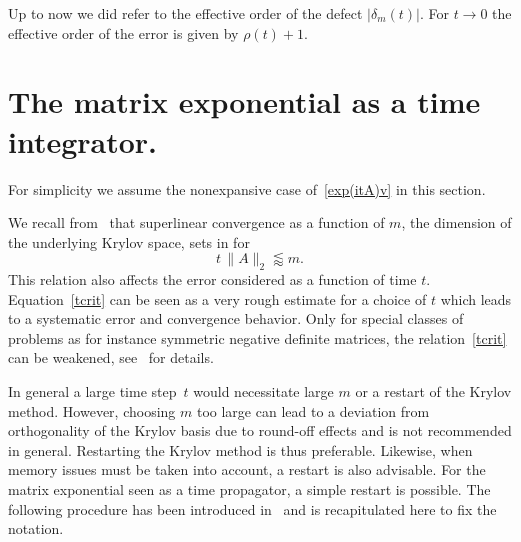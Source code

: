 \documentclass[smallextended]{svjour3pre}%
\numberwithin{equation}{section}
\numberwithin{figure}{section}
\numberwithin{table}{section}
\newcommand\tjnew[1]{{#1}}
\newcommand\Opgen{A}
\begin{document}
Up to now we did refer to the effective order of the defect $|\delta_m(t)|$. For $t \to 0$ the effective order of the error is given by $\rho(t)+1$.


\section{The matrix exponential as a time integrator.} \label{sec:timeint}
\tjnew{For simplicity we assume the nonexpansive case of~\eqref{exp(itA)v} in this section.}

We recall from~\cite{hoclub97} that superlinear convergence as a function of $ m $, the dimension of the underlying
Krylov space, sets in for
\begin{equation}\label{tcrit}
t\, \|\Opgen\|_2 \lessapprox m.
\end{equation}
This relation also affects the error considered as a function of time $t$.
Equation~\eqref{tcrit} can be seen as a very rough estimate for
a choice of $t$ which leads to a systematic error and convergence behavior.
Only for special classes of problems as for instance symmetric negative definite matrices,
the relation~\eqref{tcrit} can be weakened, see~\cite{hoclub97,becrei09} for details.

In general a large time step~$t$ would necessitate large $m$ or a restart of the Krylov method.
However, choosing $m$ too large can lead to a deviation from
orthogonality of the Krylov basis due to round-off effects and is not recommended in general.
Restarting the Krylov method is thus preferable.
\tjnew{Likewise, when memory issues must be taken into account, a restart is also advisable.}
For the matrix exponential seen as a time propagator, a simple restart is possible.
The following procedure has been introduced
in~\cite{sidje98} and is recapitulated here to fix the notation.
\end{document}
